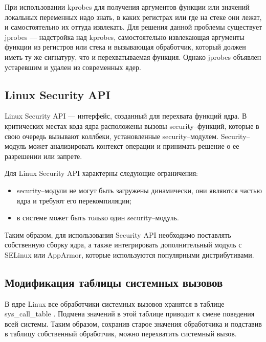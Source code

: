 При использовании kprobes для получения аргументов функции или значений локальных переменных надо знать, в каких регистрах или где на стеке они лежат, и самостоятельно их оттуда извлекать. Для решения данной проблемы существует jprobes ---  надстройка над kprobes, самостоятельно извлекающая аргументы функции из регистров или стека и вызывающая обработчик, который должен иметь ту же сигнатуру, что и перехватываемая функция. Однако jprobes объявлен устаревшим и удален из современных ядер.

\subsection{ Linux Security API}

Linux Security API --- интерфейс, созданный для перехвата функций ядра. В критических местах кода ядра расположены вызовы security--функций, которые в свою очередь вызывают коллбеки, установленные security--модулем. Security--модуль может анализировать контекст операции и принимать решение о ее разрешении или запрете.

Для Linux Security API характерны следующие ограничения:
\begin{itemize}
	\item security--модули не могут быть загружены динамически, они являются частью ядра и требуют его перекомпиляции;
	\item в системе может быть только один security--модуль.
\end{itemize}


Таким образом, для использования Security API необходимо поставлять собственную сборку ядра, а также интегрировать дополнительный модуль с SELinux или AppArmor, которые используются популярными дистрибутивами. 

\subsection{Модификация таблицы системных вызовов}

В ядре Linux все обработчики системных вызовов хранятся в таблице sys\_call\_table \cite{linux}. Подмена значений в этой таблице приводит к смене поведения всей системы. Таким образом, сохранив старое значения обработчика и подставив в таблицу собственный обработчик, можно перехватить системный вызов.

